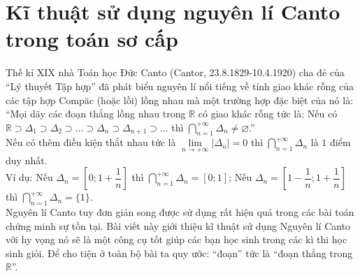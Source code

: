 
	
\section{Kĩ thuật sử dụng nguyên lí Canto trong toán sơ cấp}
\begin{center}
\textbf{\color{violet}{Trần Phương (Hà Nội)}}
\end{center}	
\noindent Thế kỉ XIX nhà Toán học Đức Canto (Cantor, 23.8.1829-10.4.1920) cha đẻ của ``Lý thuyết Tập hợp'' đã phát biểu nguyên lí nổi tiếng về tính giao khác rỗng của các tập hợp Compăc (hoặc lồi) lồng nhau mà một trường hợp đặc biệt của nó là: ``Mọi dãy các đoạn thẳng lồng nhau trong $\mathbb{R}$ có giao khác rỗng tức là: Nếu có $\mathbb{R}\supset\Delta_1\supset\Delta_2\supset\ldots\supset\Delta_n\supset\Delta_{n+1}\supset\ldots$ thì $\bigcap\limits_{n=1}^{+\infty}\Delta_n\ne\varnothing$.''\\
Nếu có thêm điều kiện thắt nhau tức là $\lim\limits_{n\to+\infty}|\Delta_n|=0$ thì $\bigcap\limits_{n=1}^{+\infty}\Delta_n$ là $1$ điểm duy nhất.\\
Ví dụ: Nếu $\Delta_n=\left[0;1+\dfrac{1}{n}\right]$ thì $\bigcap\limits_{n=1}^{+\infty}\Delta_n=[0;1]$; Nếu $\Delta_n=\left[1-\dfrac{1}{n};1+\dfrac{1}{n}\right]$ thì $\bigcap\limits_{n=1}^{+\infty}\Delta_n=\{1\}$.\\
Nguyên lí Canto tuy đơn giản song được sử dụng rất hiệu quả trong các bài toán chứng minh sự tồn tại. Bài viết này giới thiệu kĩ thuật sử dụng Nguyên lí Canto với hy vọng nó sẽ là một công cụ tốt giúp các bạn học sinh trong các kì thi học sinh giỏi. Để cho tiện ở toàn bộ bài ta quy ước: ``đoạn'' tức là ``đoạn thẳng trong $\mathbb{R}$''.

